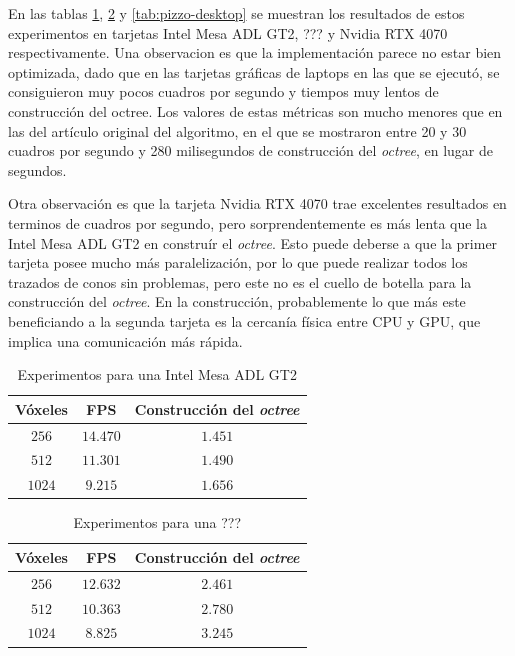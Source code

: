 En las tablas \ref{tab:cisco-laptop}, \ref{tab:pizzo-laptop} y \ref{tab:pizzo-desktop} se muestran los resultados de estos experimentos en tarjetas Intel Mesa ADL GT2, ??? y Nvidia RTX 4070 respectivamente.
Una observacion es que la implementación parece no estar bien optimizada, dado que en las tarjetas gráficas de laptops en las que se ejecutó, se consiguieron muy pocos cuadros por segundo y tiempos muy lentos de construcción del octree.
Los valores de estas métricas son mucho menores que en las del artículo original del algoritmo, en el que se mostraron entre 20 y 30 cuadros por segundo y 280 milisegundos de construcción del \textit{octree}, en lugar de segundos.

Otra observación es que la tarjeta Nvidia RTX 4070 trae excelentes resultados en terminos de cuadros por segundo, pero sorprendentemente es más lenta que la Intel Mesa ADL GT2 en construír el \textit{octree}.
Esto puede deberse a que la primer tarjeta posee mucho más paralelización, por lo que puede realizar todos los trazados de conos sin problemas, pero este no es el cuello de botella para la construcción del \textit{octree}.
En la construcción, probablemente lo que más este beneficiando a la segunda tarjeta es la cercanía física entre CPU y GPU, que implica una comunicación más rápida.

\begin{table}
\centering
\begin{tabular}{|c|c|c|}
	\hline
	\textbf{Vóxeles} & \textbf{FPS} & \textbf{Construcción del \textit{octree}} \\
	\hline
	$256$ & $14.470$ & $1.451$ \\
	\hline
	$512$ & $11.301$ & $1.490$ \\
	\hline
	$1024$ & $9.215$ & $1.656$ \\
	\hline
\end{tabular}
\caption{Experimentos para una Intel Mesa ADL GT2}
\label{tab:cisco-laptop}
\end{table}

\begin{table}
\centering
\begin{tabular}{|c|c|c|}
	\hline
	\textbf{Vóxeles} & \textbf{FPS} & \textbf{Construcción del \textit{octree}} \\
	\hline
	$256$ & $12.632$ & $2.461$ \\
	\hline
	$512$ & $10.363$ & $2.780$ \\
	\hline
	$1024$ & $8.825$ & $3.245$ \\
	\hline
\end{tabular}
\caption{Experimentos para una ???}
\label{tab:pizzo-laptop}
\end{table}

